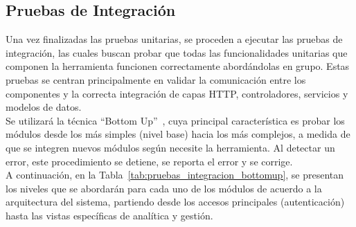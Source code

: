\subsection{Pruebas de Integración}

Una vez finalizadas las pruebas unitarias, se proceden a ejecutar las pruebas de integración, las cuales buscan probar que todas las funcionalidades unitarias que componen la herramienta funcionen correctamente abordándolas en grupo. Estas pruebas se centran principalmente en validar la comunicación entre los componentes y la correcta integración de capas HTTP, controladores, servicios y modelos de datos.\\

Se utilizará la técnica ``Bottom Up''~\cite{bottomup}, cuya principal característica es probar los módulos desde los más simples (nivel base) hacia los más complejos, a medida de que se integren nuevos módulos según necesite la herramienta. Al detectar un error, este procedimiento se detiene, se reporta el error y se corrige.\\

A continuación, en la Tabla~\ref{tab:pruebas_integracion_bottomup}, se presentan los niveles que se abordarán para cada uno de los módulos de acuerdo a la arquitectura del sistema, partiendo desde los accesos principales (autenticación) hasta las vistas específicas de analítica y gestión.

